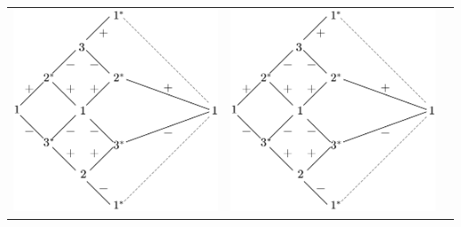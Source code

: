\documentclass[a4paper]{book}
\newcounter{solution}[chapter]
\begin{document}
\begin{solution}
\begin{itemize}
\begin{center}
\begin{tabular}{ccc}
		\begin{minipage}{0.3\linewidth}
		\centering
		\includegraphics[scale=0.5,trim=0 -8 0 -8]{./pictures/6.07/pictorial_representation_5.png}
		\end{minipage} &
		
		\begin{minipage}{0.3\linewidth}
		\centering
		\includegraphics[scale=0.5,trim=0 -8 0 -8]{./pictures/6.07/pictorial_representation_6.png}
		\end{minipage}
		

\end{tabular}
\end{center}
\end{itemize}
\end{solution}
\end{document}
